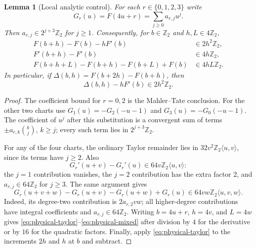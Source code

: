 \documentclass[11pt]{article}
\newtheorem{lemma}[theorem]{Lemma}
\theoremstyle{remark}\newtheorem{remark}[theorem]{Remark}
\begin{document}
\begin{lemma}[Local analytic control]\label{lem:local-control}
For each $r\in\{0,1,2,3\}$ write
\[
G_r(u)=F(4u+r)=\sum_{j\ge0}a_{r,j}u^j.
\]
Then $a_{r,j}\in2^{j+3}\mathbb Z_2$ for $j\ge1$. Consequently, for
$b\in\mathbb Z_2$ and $h,L\in4\mathbb Z_2$,
\begin{align}
F(b+h)-F(b)-hF'(b)&\in2h^2\mathbb Z_2,\label{eq:physical-taylor}\\
F'(b+h)-F'(b)&\in4h\mathbb Z_2,\label{eq:physical-derivative}\\
F(b+h+L)-F(b+h)-F(b+L)+F(b)&\in4hL\mathbb Z_2.\label{eq:physical-mixed}
\end{align}
In particular, if $\Delta(b,h)=F(b+2h)-F(b+h)$, then
\[
\Delta(b,h)-hF'(b)\in2h^2\mathbb Z_2.
\]
\end{lemma}
\begin{proof}
The coefficient bound for $r=0,2$ is the Mahler--Tate conclusion. For the
other two charts use $G_1(u)=-G_2(-u-1)$ and
$G_3(u)=-G_0(-u-1)$. The coefficient of $u^j$ after this substitution is
a convergent sum of terms $\pm a_{r,k}\binom{k}{j}$, $k\ge j$;
every such term lies in $2^{j+3}\mathbb Z_2$.

For any of the four charts, the ordinary Taylor remainder lies in
$32v^2\mathbb Z_2\langle u,v\rangle$, since its terms have $j\ge2$.
Also
\[
G_r'(u+v)-G_r'(u)\in64v\mathbb Z_2\langle u,v\rangle:
\]
the $j=1$ contribution vanishes, the $j=2$ contribution has the extra
factor $2$, and $a_{r,j}\in64\mathbb Z_2$ for $j\ge3$.
The same argument gives
\[
G_r(u+v+w)-G_r(u+v)-G_r(u+w)+G_r(u)
\in64vw\mathbb Z_2\langle u,v,w\rangle.
\]
Indeed, its degree-two contribution is $2a_{r,2}vw$; all higher-degree
contributions have integral coefficients and $a_{r,j}\in64\mathbb Z_2$.
Writing $b=4u+r$, $h=4v$, and $L=4w$ gives
\eqref{eq:physical-taylor}--\eqref{eq:physical-mixed} after division by
$4$ for the derivative or by $16$ for the quadratic factors.
Finally, apply \eqref{eq:physical-taylor} to the increments $2h$ and $h$
at $b$ and subtract.
\end{proof}
\end{document}
